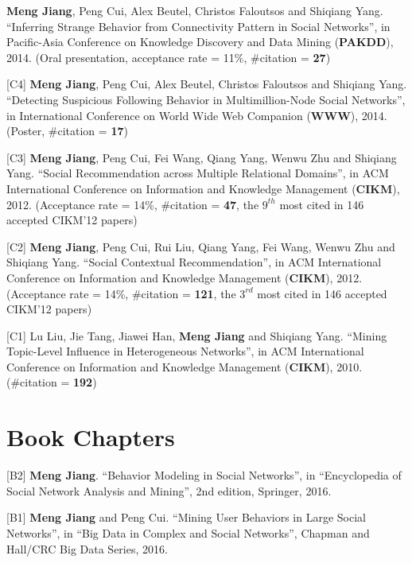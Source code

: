 \documentclass[margin, 10pt]{res}
\begin{document}
\begin{resume}
[C5] \textbf{Meng Jiang}, Peng Cui, Alex Beutel, Christos Faloutsos and Shiqiang Yang. ``Inferring Strange Behavior from Connectivity Pattern in Social Networks'', in Pacific-Asia Conference on Knowledge Discovery and Data Mining (\textbf{PAKDD}), 2014. (Oral presentation, acceptance rate = 11\%, \#citation = \textbf{27})

[C4] \textbf{Meng Jiang}, Peng Cui, Alex Beutel, Christos Faloutsos and Shiqiang Yang. ``Detecting Suspicious Following Behavior in Multimillion-Node Social Networks'', in International Conference on World Wide Web Companion (\textbf{WWW}), 2014. (Poster, \#citation = \textbf{17})

[C3] \textbf{Meng Jiang}, Peng Cui, Fei Wang, Qiang Yang, Wenwu Zhu and Shiqiang Yang. ``Social Recommendation across Multiple Relational Domains'', in ACM International Conference on Information and Knowledge Management (\textbf{CIKM}), 2012. (Acceptance rate = 14\%, \#citation = \textbf{47}, the \textbf{$9^{th}$} most cited in 146 accepted CIKM'12 papers)

[C2] \textbf{Meng Jiang}, Peng Cui, Rui Liu, Qiang Yang, Fei Wang, Wenwu Zhu and Shiqiang Yang. ``Social Contextual Recommendation'', in ACM International Conference on Information and Knowledge Management (\textbf{CIKM}), 2012. (Acceptance rate = 14\%, \#citation = \textbf{121}, the \textbf{$3^{rd}$} most cited in 146 accepted CIKM'12 papers)

[C1] Lu Liu, Jie Tang, Jiawei Han, \textbf{Meng Jiang} and Shiqiang Yang. ``Mining Topic-Level Influence in Heterogeneous Networks'', in ACM International Conference on Information and Knowledge Management (\textbf{CIKM}), 2010. (\#citation = \textbf{192})


\section{Book Chapters}

[B2] \textbf{Meng Jiang}. ``Behavior Modeling in Social Networks'', in ``Encyclopedia of Social Network Analysis and Mining'', 2nd edition, Springer, 2016.

[B1] \textbf{Meng Jiang} and Peng Cui. ``Mining User Behaviors in Large Social Networks'', in ``Big Data in Complex and Social Networks'', Chapman and Hall/CRC Big Data Series, 2016.


\end{resume}
\end{document}
